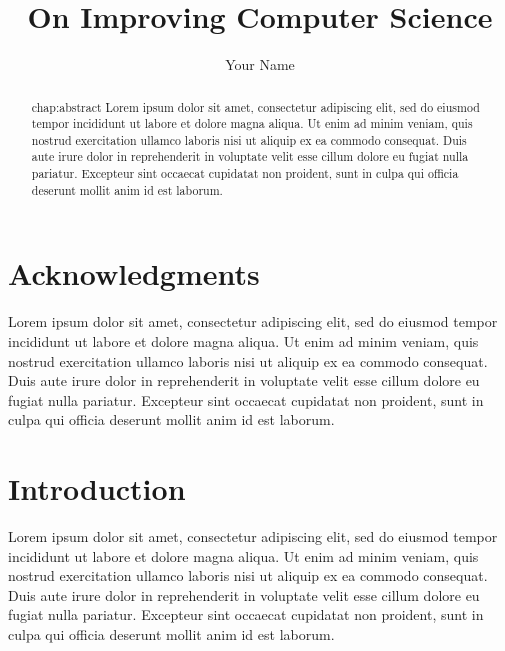 \documentclass[12pt,oneside]{amsbook}
\title{On Improving Computer Science}
\author{Your Name}
\numberwithin{section}{chapter}
\numberwithin{figure}{chapter}
\numberwithin{equation}{chapter}
\begin{document}
\frontmatter

\maketitle

\copyrightpage

\chapter*{Acknowledgments}
\label{chap:acknowledgments}

Lorem ipsum dolor sit amet, consectetur adipiscing elit, sed do eiusmod tempor
incididunt ut labore et dolore magna aliqua. Ut enim ad minim veniam, quis
nostrud exercitation ullamco laboris nisi ut aliquip ex ea commodo
consequat. Duis aute irure dolor in reprehenderit in voluptate velit esse cillum
dolore eu fugiat nulla pariatur. Excepteur sint occaecat cupidatat non proident,
sunt in culpa qui officia deserunt mollit anim id est laborum.


\begin{abstract}{chap:abstract}
  Lorem ipsum dolor sit amet, consectetur adipiscing elit, sed do eiusmod tempor
  incididunt ut labore et dolore magna aliqua. Ut enim ad minim veniam, quis
  nostrud exercitation ullamco laboris nisi ut aliquip ex ea commodo
  consequat. Duis aute irure dolor in reprehenderit in voluptate velit esse
  cillum dolore eu fugiat nulla pariatur. Excepteur sint occaecat cupidatat non
  proident, sunt in culpa qui officia deserunt mollit anim id est laborum.
\end{abstract}

\tableofcontents
\listoffigures

\mainmatter

\chapter{Introduction}
\label{chap:introduction}

Lorem ipsum dolor sit amet, consectetur adipiscing elit, sed do eiusmod tempor
incididunt ut labore et dolore magna aliqua. Ut enim ad minim veniam, quis
nostrud exercitation ullamco laboris nisi ut aliquip ex ea commodo
consequat. Duis aute irure dolor in reprehenderit in voluptate velit esse cillum
dolore eu fugiat nulla pariatur. Excepteur sint occaecat cupidatat non proident,
sunt in culpa qui officia deserunt mollit anim id est laborum.




\end{document}
